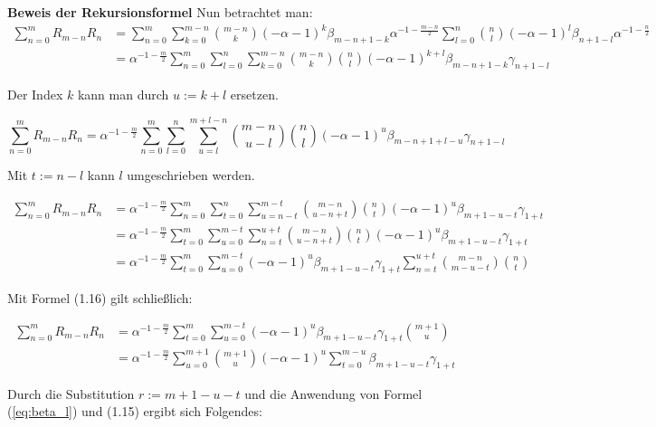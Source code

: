 \documentclass[a4paper, 11pt]{scrreprt}
\begin{document}
\textbf{Beweis der Rekursionsformel}
Nun betrachtet man:
\begin{align*}
\sum_{n=0}^m R_{m-n} R_n 
&= \sum_{n=0}^m \sum_{k=0}^{m-n} \binom{m-n}{k} (-\alpha -1)^k \beta_{m-n+1-k} \alpha^{-1-\frac{m-n}{2}} \sum_{l=0}^n \binom{n}{l} (-\alpha -1)^l \beta_{n+1-l} \alpha^{-1-\frac{n}{2}} \\
&= \alpha^{-1-\frac{m}{2}} \sum_{n=0}^m \sum_{l=0}^n \sum_{k=0}^{m-n} \binom{m-n}{k}  \binom{n}{l} (-\alpha -1)^{k+l} \beta_{m-n+1-k} \gamma_{n+1-l}	
\end{align*}

Der Index $k$ kann man durch $u:=k+l$ ersetzen.

\[\sum_{n=0}^m R_{m-n} R_n = \alpha^{-1-\frac{m}{2}} \sum_{n=0}^m \sum_{l=0}^n \sum_{u=l}^{m+l-n} \binom{m-n}{u-l}  \binom{n}{l} (-\alpha -1)^u \beta_{m-n+1+l-u} \gamma_{n+1-l}\]

Mit $t:=n-l$ kann $l$ umgeschrieben werden.

\begin{align*}
\sum_{n=0}^m R_{m-n} R_n 
&= \alpha^{-1-\frac{m}{2}} \sum_{n=0}^m \sum_{t=0}^n \sum_{u=n-t}^{m-t} \binom{m-n}{u-n+t}  \binom{n}{t} (-\alpha -1)^u \beta_{m+1-u-t} \gamma_{1+t} \\
&= \alpha^{-1-\frac{m}{2}} \sum_{t=0}^m \sum_{u=0}^{m-t} \sum_{n=t}^{u+t} \binom{m-n}{u-n+t}  \binom{n}{t} (-\alpha -1)^u \beta_{m+1-u-t} \gamma_{1+t} \\
&= \alpha^{-1-\frac{m}{2}} \sum_{t=0}^{m} \sum_{u=0}^{m-t} (-\alpha -1)^u \beta_{m+1-u-t} \gamma_{1+t} \sum_{n=t}^{u+t} \binom{m-n}{m-u-t}  \binom{n}{t}
\end{align*}

Mit Formel (1.16) gilt schließlich:

\begin{align*}
\sum_{n=0}^m R_{m-n} R_n 
&= \alpha^{-1-\frac{m}{2}} \sum_{t=0}^m \sum_{u=0}^{m-t} (-\alpha -1)^u \beta_{m+1-u-t} \gamma_{1+t} \binom{m+1}{u} \\
&= \alpha^{-1-\frac{m}{2}} \sum_{u=0}^{m+1} \binom{m+1}{u} (-\alpha -1)^u \sum_{t=0}^{m-u} \beta_{m+1-u-t} \gamma_{1+t}
\end{align*}

Durch die Substitution $r := m+1-u-t$ und die Anwendung von Formel (\ref{eq:beta_l}) und (1.15) ergibt sich Folgendes:
\end{document}
